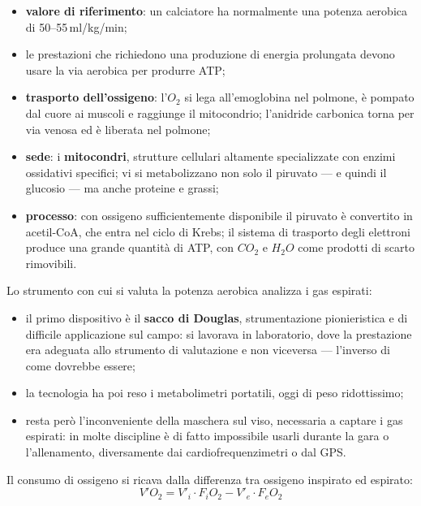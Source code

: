 \begin{itemize}
  \item \textbf{valore di riferimento}: un calciatore ha normalmente una potenza aerobica di
    50--55\,ml/kg/min;
  \item le prestazioni che richiedono una produzione di energia prolungata devono usare la via
    aerobica per produrre ATP;
  \item \textbf{trasporto dell'ossigeno}: l'$O_2$ si lega all'emoglobina nel polmone, è pompato dal
    cuore ai muscoli e raggiunge il mitocondrio; l'anidride carbonica torna per via venosa ed è
    liberata nel polmone;
  \item \textbf{sede}: i \textbf{mitocondri}, strutture cellulari altamente specializzate con enzimi
    ossidativi specifici; vi si metabolizzano non solo il piruvato --- e quindi il glucosio --- ma
    anche proteine e grassi;
  \item \textbf{processo}: con ossigeno sufficientemente disponibile il piruvato è convertito in
    acetil-CoA, che entra nel ciclo di Krebs; il sistema di trasporto degli elettroni produce una
    grande quantità di ATP, con $CO_2$ e $H_2O$ come prodotti di scarto rimovibili.
\end{itemize}

Lo strumento con cui si valuta la potenza aerobica analizza i gas espirati:
\begin{itemize}
  \item il primo dispositivo è il \textbf{sacco di Douglas}, strumentazione pionieristica e di
    difficile applicazione sul campo: si lavorava in laboratorio, dove la prestazione era adeguata
    allo strumento di valutazione e non viceversa --- l'inverso di come dovrebbe essere;
  \item la tecnologia ha poi reso i metabolimetri portatili, oggi di peso ridottissimo;
  \item resta però l'inconveniente della maschera sul viso, necessaria a captare i gas espirati: in
    molte discipline è di fatto impossibile usarli durante la gara o l'allenamento, diversamente dai
    cardiofrequenzimetri o dal GPS.
\end{itemize}
Il consumo di ossigeno si ricava dalla differenza tra ossigeno inspirato ed espirato:
$$V'O_2 = V'_i \cdot F_iO_2 - V'_e \cdot F_eO_2$$

